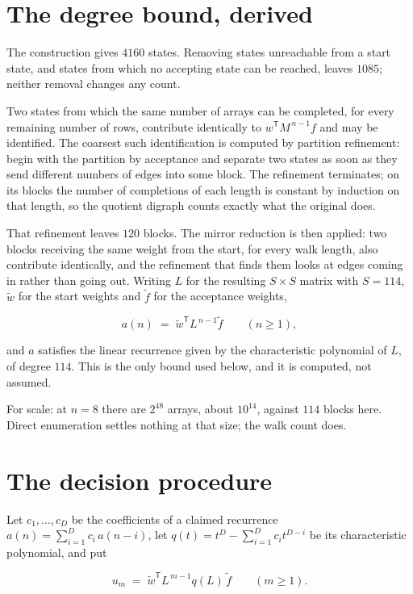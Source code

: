 \documentclass[11pt]{article}
\theoremstyle{definition}
\begin{document}
\section{The degree bound, derived}

The construction gives $4160$ states. Removing states unreachable from a start state, and states from which no accepting state can be reached, leaves $1085$; neither removal changes any count.

Two states from which the same number of arrays can be completed, for every remaining number of rows, contribute identically to $w^{\mathsf T}M^{\,n-1}f$ and may be identified. The coarsest such identification is computed by partition refinement: begin with the partition by acceptance and separate two states as soon as they send different numbers of edges into some block. The refinement terminates; on its blocks the number of completions of each length is constant by induction on that length, so the quotient digraph counts exactly what the original does.

That refinement leaves $120$ blocks. The mirror reduction is then applied: two blocks receiving the same weight from the start, for every walk length, also contribute identically, and the refinement that finds them looks at edges coming in rather than going out. Writing $L$ for the resulting $S \times S$ matrix with $S = 114$, $\tilde w$ for the start weights and $\tilde f$ for the acceptance weights,

\[a(n) \;=\; \tilde w^{\mathsf T} L^{\,n-1} \tilde f \qquad (n \ge 1),\]

and $a$ satisfies the linear recurrence given by the characteristic polynomial of $L$, of degree $114$. This is the only bound used below, and it is computed, not assumed.

For scale: at $n = 8$ there are $2^{48}$ arrays, about $10^{14}$, against $114$ blocks here. Direct enumeration settles nothing at that size; the walk count does.

\section{The decision procedure}

Let $c_1,\dots,c_D$ be the coefficients of a claimed recurrence $a(n) = \sum_{i=1}^{D} c_i\,a(n-i)$, let $q(t) = t^{D} - \sum_{i=1}^{D} c_i t^{D-i}$ be its characteristic polynomial, and put

\[u_m \;=\; \tilde w^{\mathsf T} L^{\,m-1} q(L)\,\tilde f \qquad (m \ge 1).\]
\end{document}
